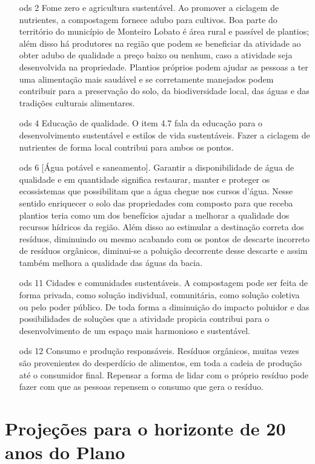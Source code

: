 \begin{itemize}
	\item[\gls{ods} 2] Fome zero e agricultura sustentável. Ao promover a ciclagem de nutrientes, a compostagem fornece adubo para cultivos. Boa parte do território do município de Monteiro Lobato é área rural e passível de plantios; além disso há produtores na região que podem se beneficiar da atividade ao obter adubo de qualidade a preço baixo ou nenhum, caso a atividade seja desenvolvida na propriedade. Plantios próprios podem ajudar as pessoas a ter uma alimentação mais saudável e se corretamente manejados podem contribuir para a preservação do solo, da biodiversidade local, das águas e das tradições culturais alimentares.
	\item[\gls{ods} 4] Educação de qualidade. O item 4.7 fala da educação para o desenvolvimento sustentável e estilos de vida sustentáveis. Fazer a ciclagem de nutrientes de forma local contribui para ambos os pontos.
	\item[\gls{ods} 6] [Água potável e saneamento]. Garantir a disponibilidade de água de qualidade e em quantidade significa restaurar, manter e proteger os ecossistemas que possibilitam que a água chegue nos cursos d'água. Nesse sentido enriquecer o solo das propriedades com composto para que receba plantios teria como um dos benefícios ajudar a melhorar a qualidade dos recursos hídricos da região. Além disso ao estimular a destinação correta dos resíduos, diminuindo ou mesmo acabando com os pontos de descarte incorreto de resíduos orgânicos, diminui-se a poluição decorrente desse descarte e assim também melhora a qualidade das águas da bacia. 
	\item[\gls{ods} 11]	Cidades e comunidades sustentáveis. A compostagem pode ser feita de forma privada, como solução individual, comunitária, como solução coletiva ou pelo poder público. De toda forma a diminuição do impacto poluidor e das possibilidades de soluções que a atividade propicia contribui para o desenvolvimento de um espaço mais harmonioso e sustentável.
	\item[\gls{ods} 12] Consumo e produção responsáveis. Resíduos orgânicos, muitas vezes são provenientes do desperdício de alimentos, em toda a cadeia de produção até o consumidor final. Repensar a forma de lidar com o próprio resíduo pode fazer com que as pessoas repensem o consumo que gera o resíduo.  
\end{itemize}


\newpage
\FloatBarrier
\section{Projeções para o horizonte de 20 anos do Plano}


